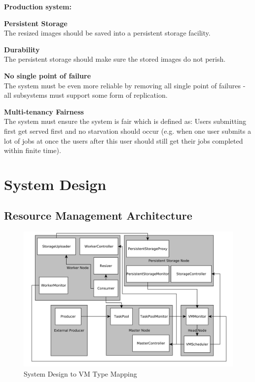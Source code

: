 \documentclass[10pt,journal,compsoc]{IEEEtran}
\makeatletter
\def\nameddisplayedlabel#1#2{
  \label{#1}
  \begingroup
   \def\@currentlabel{#2}%
   \label{#1:name}\endgroup
   \textbf{#2}\hfill\\
}
\makeatother
\begin{document}
\noindent\textbf{Production system:}
\begin{enumerate}[leftmargin=1.5cm,label={[FR:\arabic*]},start=3]
  \item\nameddisplayedlabel{fr:persistent-storage}{Persistent Storage}
  The resized images should be saved into a persistent storage facility.
  \end{enumerate}
\begin{enumerate}[leftmargin=1.5cm,label={[NFR:\arabic*]},start=7]
  \item\nameddisplayedlabel{nfr:durability}{Durability}
  The persistent storage should make sure the stored images do not perish.
  \item\nameddisplayedlabel{nfr:no-spof}{No single point of failure}
    The system must be even more reliable by removing all single point of
        failures - all subsystems must support some form of replication.
  \item\nameddisplayedlabel{nfr:fairness}{Multi-tenancy Fairness}
    The system must ensure the system is fair which is defined as: Users
    submitting first get served first and no starvation should occur (e.g. when
    one user submits a lot of jobs at once the users after this user should
    still get their jobs completed within finite time).
    \end{enumerate}


\section{System Design}
\label{sec:System Design}
\subsection{Resource Management Architecture}
\label{ssec:Resource Management Architecture}
\begin{figure}
\centering
\includegraphics[width=0.9\linewidth]{system_design.pdf}
\caption{System Design to VM Type Mapping}
\label{fig:system-design}
\end{figure}
\end{document}
